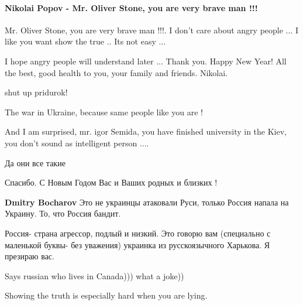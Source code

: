  
 
 
 
 

\paragraph{Nikolai Popov - Mr. Oliver Stone, you are very brave man !!!}

\begin{itemize} %

Mr. Oliver Stone, you are very brave man !!!. I don't care about angry people
... I like you want show the true .. Its not easy ...

I hope angry people will understand later ... Thank you. Happy New Year! All
the best, good health to you, your family and friends. Nikolai.

\begin{itemize} %
shut up pridurok!

The war in Ukraine, because same people like you are !

And I am surprised, mr. igor Semida, you have finished university in the Kiev, you don't sound as intelligent person ....

Да они все такие

Спасибо. С Новым Годом Вас и Ваших родных и близких !

\textbf{Dmitry Bocharov}
Это не украинцы атаковали Руси, только Россия напала на Украину. То, что Россия бандит.


Россия- страна агрессор, подлый и низкий. Это говорю вам (специально с
маленькой буквы- без уважения) украинка из русскоязычного Харькова. Я презираю
вас.


Says russian who lives in Canada))) what a joke))

Showing the truth is especially hard when you are lying.


\end{itemize}
\end{itemize}

